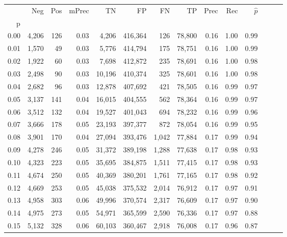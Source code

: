 \begin{tabular}{rrrrrrrrrrrrrr}
\toprule
{} &    Neg &    Pos & mPrec &       TN &       FP &      FN &      TP &  Prec &   Rec & $\hat{p}$ \\
p    &        &        &       &          &          &         &         &       &       &           \\
\midrule
0.00 &  4,206 &    126 &  0.03 &    4,206 &  416,364 &     126 &  78,800 &  0.16 &  1.00 &      0.99 \\
0.01 &  1,570 &     49 &  0.03 &    5,776 &  414,794 &     175 &  78,751 &  0.16 &  1.00 &      0.99 \\
0.02 &  1,922 &     60 &  0.03 &    7,698 &  412,872 &     235 &  78,691 &  0.16 &  1.00 &      0.98 \\
0.03 &  2,498 &     90 &  0.03 &   10,196 &  410,374 &     325 &  78,601 &  0.16 &  1.00 &      0.98 \\
0.04 &  2,682 &     96 &  0.03 &   12,878 &  407,692 &     421 &  78,505 &  0.16 &  0.99 &      0.97 \\
0.05 &  3,137 &    141 &  0.04 &   16,015 &  404,555 &     562 &  78,364 &  0.16 &  0.99 &      0.97 \\
0.06 &  3,512 &    132 &  0.04 &   19,527 &  401,043 &     694 &  78,232 &  0.16 &  0.99 &      0.96 \\
0.07 &  3,666 &    178 &  0.05 &   23,193 &  397,377 &     872 &  78,054 &  0.16 &  0.99 &      0.95 \\
0.08 &  3,901 &    170 &  0.04 &   27,094 &  393,476 &   1,042 &  77,884 &  0.17 &  0.99 &      0.94 \\
0.09 &  4,278 &    246 &  0.05 &   31,372 &  389,198 &   1,288 &  77,638 &  0.17 &  0.98 &      0.93 \\
0.10 &  4,323 &    223 &  0.05 &   35,695 &  384,875 &   1,511 &  77,415 &  0.17 &  0.98 &      0.93 \\
0.11 &  4,674 &    250 &  0.05 &   40,369 &  380,201 &   1,761 &  77,165 &  0.17 &  0.98 &      0.92 \\
0.12 &  4,669 &    253 &  0.05 &   45,038 &  375,532 &   2,014 &  76,912 &  0.17 &  0.97 &      0.91 \\
0.13 &  4,958 &    303 &  0.06 &   49,996 &  370,574 &   2,317 &  76,609 &  0.17 &  0.97 &      0.90 \\
0.14 &  4,975 &    273 &  0.05 &   54,971 &  365,599 &   2,590 &  76,336 &  0.17 &  0.97 &      0.88 \\
0.15 &  5,132 &    328 &  0.06 &   60,103 &  360,467 &   2,918 &  76,008 &  0.17 &  0.96 &      0.87 \\

\end{tabular}
